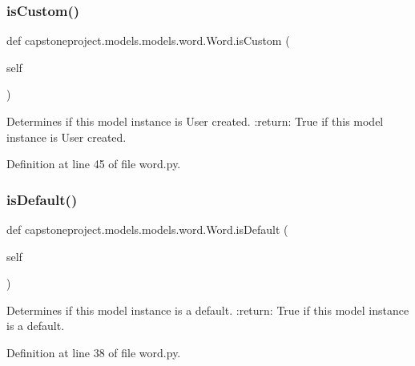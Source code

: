 \subsubsection{\texorpdfstring{is\+Custom()}{isCustom()}}
{\footnotesize\ttfamily def capstoneproject.\+models.\+models.\+word.\+Word.\+is\+Custom (\begin{DoxyParamCaption}\item[{}]{self }\end{DoxyParamCaption})}

\begin{DoxyVerb}Determines if this model instance is User created.
:return: True if this model instance is User created.
\end{DoxyVerb}
 

Definition at line 45 of file word.\+py.

\mbox{\label{classcapstoneproject_1_1models_1_1models_1_1word_1_1_word_a89f963526b4f20842edea51501506e57}} 
\subsubsection{\texorpdfstring{is\+Default()}{isDefault()}}
{\footnotesize\ttfamily def capstoneproject.\+models.\+models.\+word.\+Word.\+is\+Default (\begin{DoxyParamCaption}\item[{}]{self }\end{DoxyParamCaption})}

\begin{DoxyVerb}Determines if this model instance is a default.
:return: True if this model instance is a default.
\end{DoxyVerb}
 

Definition at line 38 of file word.\+py.

\mbox{\label{classcapstoneproject_1_1models_1_1models_1_1word_1_1_word_a2ce1740d8a560020d9421af52f740bcd}} 
